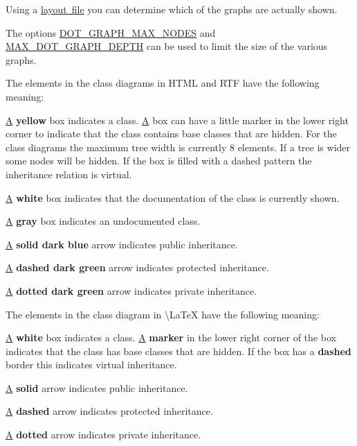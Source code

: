 Using a \mbox{\hyperlink{customize}{layout file}} you can determine which of the graphs are actually shown.

The options \mbox{\hyperlink{config_cfg_dot_graph_max_nodes}{D\+O\+T\+\_\+\+G\+R\+A\+P\+H\+\_\+\+M\+A\+X\+\_\+\+N\+O\+D\+ES}} and \mbox{\hyperlink{config_cfg_max_dot_graph_depth}{M\+A\+X\+\_\+\+D\+O\+T\+\_\+\+G\+R\+A\+P\+H\+\_\+\+D\+E\+P\+TH}} can be used to limit the size of the various graphs.

The elements in the class diagrams in H\+T\+ML and R\+TF have the following meaning\+: 
\begin{DoxyItemize}
\item \mbox{\hyperlink{class_a}{A}} {\bfseries{yellow}} box indicates a class. \mbox{\hyperlink{class_a}{A}} box can have a little marker in the lower right corner to indicate that the class contains base classes that are hidden. For the class diagrams the maximum tree width is currently 8 elements. If a tree is wider some nodes will be hidden. If the box is filled with a dashed pattern the inheritance relation is virtual. 
\item \mbox{\hyperlink{class_a}{A}} {\bfseries{white}} box indicates that the documentation of the class is currently shown. 
\item \mbox{\hyperlink{class_a}{A}} {\bfseries{gray}} box indicates an undocumented class. 
\item \mbox{\hyperlink{class_a}{A}} {\bfseries{solid dark blue}} arrow indicates public inheritance. 
\item \mbox{\hyperlink{class_a}{A}} {\bfseries{dashed dark green}} arrow indicates protected inheritance. 
\item \mbox{\hyperlink{class_a}{A}} {\bfseries{dotted dark green}} arrow indicates private inheritance. 
\end{DoxyItemize}

The elements in the class diagram in \textbackslash{}\+La\+TeX have the following meaning\+: 
\begin{DoxyItemize}
\item \mbox{\hyperlink{class_a}{A}} {\bfseries{white}} box indicates a class. \mbox{\hyperlink{class_a}{A}} {\bfseries{marker}} in the lower right corner of the box indicates that the class has base classes that are hidden. If the box has a {\bfseries{dashed}} border this indicates virtual inheritance. 
\item \mbox{\hyperlink{class_a}{A}} {\bfseries{solid}} arrow indicates public inheritance. 
\item \mbox{\hyperlink{class_a}{A}} {\bfseries{dashed}} arrow indicates protected inheritance. 
\item \mbox{\hyperlink{class_a}{A}} {\bfseries{dotted}} arrow indicates private inheritance. 
\end{DoxyItemize}

